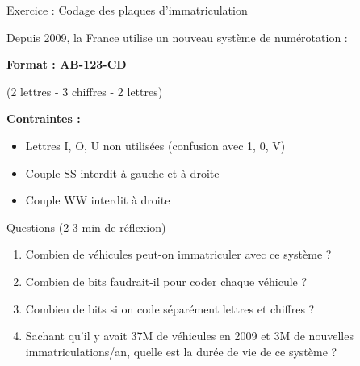 \documentclass[aspectratio=1610]{beamer}
\begin{document}
\begin{frame}{Exercice : Codage des plaques d'immatriculation}

  Depuis 2009, la France utilise un nouveau système de numérotation :

  \vspace{0.5em}

  \begin{center}
    \textbf{Format : AB-123-CD}

    (2 lettres - 3 chiffres - 2 lettres)
  \end{center}

  \vspace{0.5em}

  \textbf{Contraintes :}
  \begin{itemize}
    \item Lettres I, O, U non utilisées (confusion avec 1, 0, V)
    \item Couple SS interdit à gauche et à droite
    \item Couple WW interdit à droite
  \end{itemize}

  \vspace{0.5em}

  \begin{alertblock}{Questions (2-3 min de réflexion)}
    \begin{enumerate}
      \item Combien de véhicules peut-on immatriculer avec ce système ?
      \item Combien de bits faudrait-il pour coder chaque véhicule ?
      \item Combien de bits si on code séparément lettres et chiffres ?
      \item Sachant qu'il y avait 37M de véhicules en 2009 et 3M de nouvelles immatriculations/an, quelle est la durée de vie de ce système ?
    \end{enumerate}
  \end{alertblock}

\end{frame}
%
\end{document}
